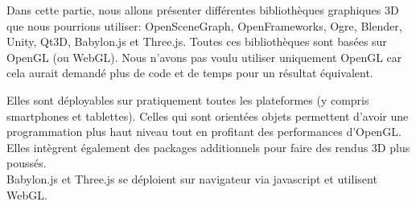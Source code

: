 Dans cette partie, nous allons présenter différentes bibliothèques graphiques 3D que nous pourrions utiliser: OpenSceneGraph, OpenFrameworks, Ogre, Blender, Unity, Qt3D, Babylon.js et Three.js. Toutes ces bibliothèques sont basées sur OpenGL (ou WebGL). Nous n'avons pas voulu utiliser uniquement OpenGL car cela aurait demandé plus de code et de temps pour un résultat équivalent. 

Elles sont déployables sur pratiquement toutes les plateformes (y compris smartphones et tablettes). Celles qui sont orientées objets permettent d'avoir une programmation plus haut niveau tout en profitant des performances d'OpenGL. Elles intègrent également des packages additionnels pour faire des rendus 3D plus poussés. \\
Babylon.js et Three.js se déploient sur navigateur via javascript et utilisent WebGL.
